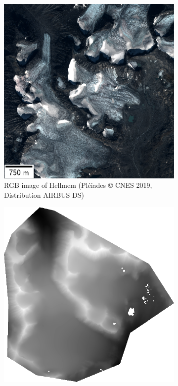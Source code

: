 \begin{figure}
    \centering
    \begin{subfigure}[t]{0.48\linewidth}
        \flushleft
        \includegraphics[width=\linewidth]{Images/Chap_6/miniature_Hellmem.png}
        \caption{RGB image of Hellmem (Pléiades © CNES 2019, Distribution AIRBUS DS)}
        \label{fig:miniature_Hellmem_rgb}
    \end{subfigure}\hfill
    \begin{subfigure}[t]{0.48\linewidth}
        \flushright
        \includegraphics[width=\linewidth]{Images/Chap_6/miniature_Hellmem_gt.png}

\end{subfigure}
\end{figure}
